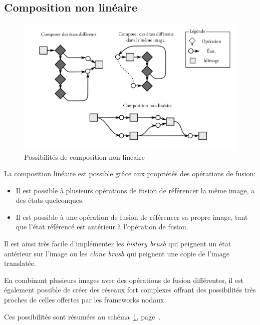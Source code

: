 		\subsection{Composition non linéaire}
		\begin{figure}[ht]
			\centering
			\includegraphics[width=\textwidth]{images/compnonlin} 
			\caption{Possibilités de composition non linéaire}
			\label{fig:compnonlin}
		\end{figure}
			La composition linéaire est possible grâce aux propriétés des opérations de fusion:
			\begin{itemize}
				\item Il est possible à plusieurs opérations de fusion de référencer la même image, a des états quelconques.
				\item Il est possible à une opération de fusion de référencer sa propre image, tant que l'état référencé est antérieur
				à l'opération de fusion.
			\end{itemize}
			Il est ainsi très facile d'implémenter les \emph{history brush} qui peignent un état antérieur sur l'image ou les \emph{clone brush}
			qui peignent une copie de l'image translatée. 

			En combinant plusieurs images avec des opérations de fusion différentes, il est également possible de créer des réseaux fort complexes
			offrant des possibilités très proches de celles offertes par les frameworks nodaux. 

			Ces possibilités sont résumées au schéma~\ref{fig:compnonlin}, page~\pageref{fig:compnonlin}.

